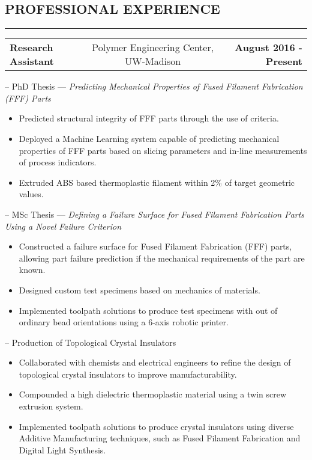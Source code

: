 \documentclass[11pt,letterpaper]{article}
\makeatletter
\newcommand{\headerrow}[3]
{\vspace{0.4em}
\noindent
\begin{tabular*}{\textwidth}{l @{\extracolsep{\fill}} cr}
	\textbf{#1} & %
	#2 &		  %
	\textbf{#3}\\ %
\end{tabular*}}
\makeatother
\begin{document}
\subsection*{PROFESSIONAL EXPERIENCE}
	\vspace{-0.5em}
	\hrule

	\headerrow
		{Research Assistant}
		{Polymer Engineering Center, UW-Madison}
		{August 2016 - Present}		

		\noindent -- PhD Thesis --- \emph{Predicting Mechanical Properties of Fused Filament Fabrication (FFF) Parts}
		\begin{itemize}
			\item Predicted structural integrity of FFF parts through the use of criteria.
			\item Deployed a Machine Learning system capable of predicting mechanical properties of FFF parts based on slicing parameters and in-line measurements of process indicators.
			\item Extruded ABS based thermoplastic filament within 2\% of target geometric values. 
		\end{itemize}
		
		\noindent -- MSc Thesis --- \emph{Defining a Failure Surface for Fused Filament Fabrication Parts Using a Novel Failure Criterion}
		\begin{itemize}
			\item Constructed a failure surface for Fused Filament Fabrication (FFF) parts, allowing part failure prediction if the mechanical requirements of the part are known.
			\item Designed custom test specimens based on mechanics of materials.
			\item Implemented toolpath solutions to produce test specimens with out of ordinary bead orientations using a 6-axis robotic printer.
		\end{itemize}
		
		\noindent -- Production of Topological Crystal Insulators
		
		\begin{itemize}
			\item Collaborated with chemists and electrical engineers to refine the design of topological crystal insulators to improve manufacturability.
			\item Compounded a high dielectric thermoplastic material using a twin screw extrusion system.
			\item Implemented toolpath solutions to produce crystal insulators using diverse Additive Manufacturing techniques, such as Fused Filament Fabrication and Digital Light Synthesis.  
		\end{itemize}
				
\end{document}
